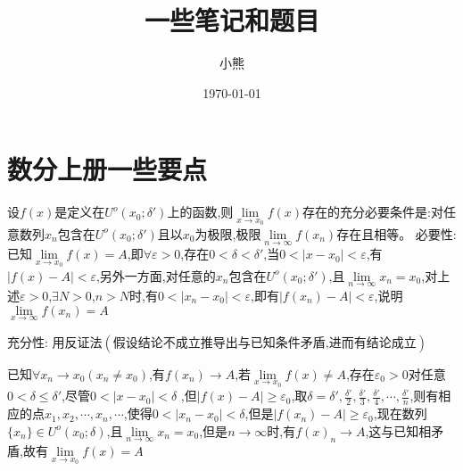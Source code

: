 \documentclass{ctexart}
\date{\today}
\author{小熊}
\title{\textbf{一些笔记和题目}}
\begin{document}
	\maketitle


	\section{数分上册一些要点}
\begin{tcolorbox}[title = {归结原理},colbacktitle=green!35!black,colback=green!1,arc = 3mm, outer arc = 3mm,fonttitle = \itshape, fontupper = \itshape, fontlower = \itshape]
	 	设$f(x)$是定义在$U^{o}(x_{0};\delta')$上的函数,则$\lim\limits_{x \to x_{0}}f(x)$存在的充分必要条件是:对任意数列${x_{n}}$包含在$U^{o}(x_{0};\delta')$且以$x_{0}$为极限,极限$\lim\limits_{n \to \infty}f(x_{n})$存在且相等。
	 	\tcblower
	 	{\color{red}必要性:} 已知$\lim\limits_{x \to x_{0}}f(x)=A$,即$\forall \varepsilon > 0$,存在$0< \delta <\delta'$,当$0 <\left|x-x_{0}\right| <\varepsilon$,有$\left|f(x)-A\right| < \varepsilon $,另外一方面,对任意的${x_{n}}$包含在$U^{o}(x_{0};\delta')$,且$\lim\limits_{n \to \infty}x_{n}=x_{0}$,对上述$\varepsilon >0$,$\exists N>0$,$n>N$时,有$0< \left|x_{n}-x_{0} \right| < \varepsilon$,即有$ \left|f(x_{n})-A\right| < \varepsilon$,说明$\lim\limits_{x \to \infty}f(x_{n})=A$
	 	
	 	{\color{red}充分性:} 用反证法$\left(\text{假设结论不成立推导出与已知条件矛盾,进而有结论成立} \right) $
	 	
	 	已知$\forall x_{n} \to x_{0}\left(x_{n} \ne x_{0} \right) $,有$f(x_{n}) \to A$,若$\lim\limits_{x \to x_{0}}f(x)\ne A$,存在$\varepsilon_{0} >0$对任意$0< \delta \le \delta' $,尽管$0< \left|x-x_{0} \right| < \delta$ ,但$\left|f(x)-A \right| \ge \varepsilon_{0}$,取$\displaystyle{\delta = \delta',\frac{\delta'}{2},\frac{\delta'}{3},\frac{\delta'}{4},\cdots,\frac{\delta'}{n}}$,则有相应的点$x_{1},x_{2},\cdots,x_{n},\cdots$,使得$0 < \left|x_{n}-x_{0}\right| < \delta$,但是$ \left|f(x_{n})-A\right| \ge \varepsilon_{0}$,现在数列$\{x_{n}\} \in U^{o}\left(x_{0};\delta\right) $,且$\lim\limits_{n \to \infty}x_{n}=x_{0}$,但是$n \to \infty$时,有$f(x)_{n} \to A$,这与已知相矛盾,故有$\lim\limits_{x \to x_{0}}f(x) = A$
	 \end{tcolorbox}
\end{document}
